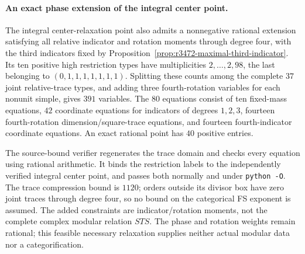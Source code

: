 \paragraph{An exact phase extension of the integral center point.}
The integral center-relaxation point also admits a nonnegative rational
extension satisfying all relative indicator and rotation moments through
degree four, with the third indicators fixed by
Proposition~\ref{prop:r3472-maximal-third-indicator}.
Its ten positive high restriction types have multiplicities
$2,\ldots,2,98$, the last belonging to $(0,1,1,1,1,1,1,1)$.
Splitting these counts among the complete $37$ joint relative-trace
types, and adding three fourth-rotation variables for each nonunit
simple, gives $391$ variables. The $80$ equations consist of ten
fixed-mass equations, $42$ coordinate equations for indicators of
degrees $1,2,3$, fourteen fourth-rotation dimension/square-trace
equations, and fourteen fourth-indicator coordinate equations.
An exact rational point has $40$ positive entries.

The source-bound verifier
regenerates the trace domain and checks every equation using rational
arithmetic. It binds the restriction labels to the independently
verified integral center point, and passes both normally and under
\texttt{python -O}. The trace compression bound is $1120$; orders
outside its divisor box have zero joint traces through degree four,
so no bound on the categorical FS exponent is assumed.
The added constraints are indicator/rotation moments, not the complete
complex modular relation $STS$. The phase and rotation weights remain
rational; this feasible necessary relaxation supplies neither actual
modular data nor a categorification.
